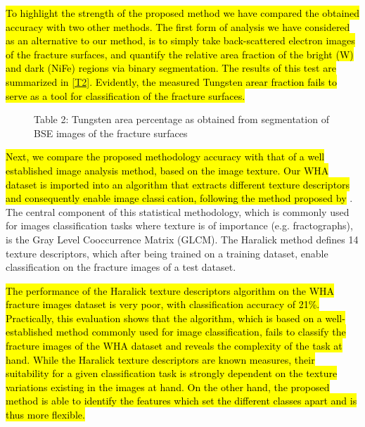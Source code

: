 \documentclass[authoryear,preprint,review,12pt, singleside]{elsarticle}
\begin{document}
\hl{To highlight the strength of the proposed method we have compared the obtained accuracy with two other methods. The first form of analysis we have considered as an alternative to our method, is to simply take back-scattered electron images of the fracture surfaces, and quantify the relative area fraction of  the bright (W) and dark (NiFe) regions via binary segmentation. The results of this test are summarized in \ref{T2}. Evidently, the measured Tungsten arear fraction fails to serve as a tool for classification of the fracture surfaces. }
\begin{figure}[!h]
	\centering
	\caption{Table 2: Tungsten area percentage as obtained from segmentation of BSE images of the fracture surfaces}
	\label{fig:T2}
\end{figure}

\hl{Next, we compare the proposed methodology accuracy with that of a well established image analysis method, based on the image texture. Our WHA dataset is imported into an algorithm that extracts different texture descriptors and consequently enable image classication, following the method proposed by} \citet{haralick}. The central component of this statistical methodology, which is commonly used for images classification tasks where texture is of importance (e.g. fractographs), is the Gray Level Cooccurrence Matrix (GLCM). The Haralick method defines 14 texture descriptors, which after being trained on a training dataset, enable classification on the fracture images of a test dataset. 

\hl{The performance of the Haralick texture descriptors algorithm on the WHA fracture images dataset is very poor, with classification accuracy of 21\%. Practically, this evaluation shows that the algorithm, which is based on a well-established method commonly used  for image classification, fails to classify the fracture images of the WHA dataset and reveals the complexity of the task at hand. While the Haralick texture descriptors are known measures, their suitability for a given classification task is strongly dependent on the texture variations existing in the images at hand. On the other hand, the proposed method is able to identify the features which set the different classes apart and is thus more flexible.}
	
\end{document}
